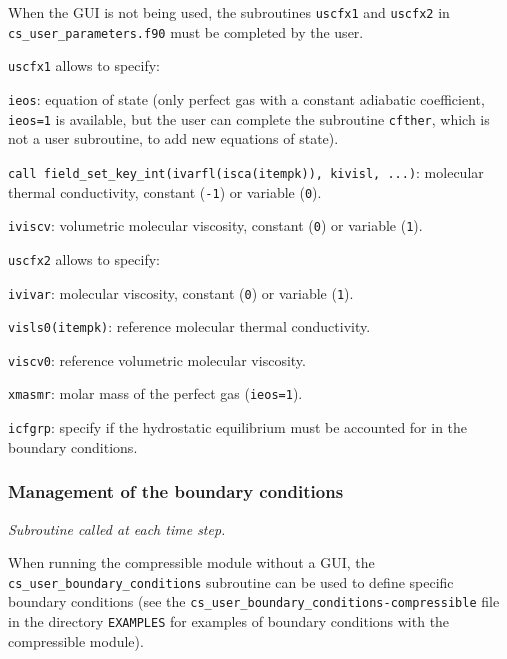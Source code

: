 {{{When the GUI is not being used, the subroutines \texttt{uscfx1} and \texttt{uscfx2} in \texttt{cs\_user\_parameters.f90}
must be completed by the user.

\texttt{uscfx1} allows to specify:
\begin{list}{-}{}
\item \texttt{ieos}: equation of state (only perfect gas with a constant adiabatic coefficient,
                      \texttt{ieos=1} is available, but the user can complete the subroutine
                      \texttt{cfther}, which is not a user subroutine, to add new equations of state).
\item \texttt{call field\_set\_key\_int(ivarfl(isca(itempk)), kivisl, ...)}: molecular thermal conductivity, constant (\texttt{-1}) or variable (\texttt{0}).
\item  \texttt{iviscv}: volumetric molecular viscosity, constant (\texttt{0}) or variable (\texttt{1}).
\end{list}

\texttt{uscfx2} allows to specify:
\begin{list}{-}{}
  \item \texttt{ivivar}: molecular viscosity, constant (\texttt{0}) or variable (\texttt{1}).
  \item \texttt{visls0(itempk)}: reference molecular thermal conductivity.
  \item \texttt{viscv0}: reference volumetric molecular viscosity.
  \item \texttt{xmasmr}: molar mass of the perfect gas (\texttt{ieos=1}).
  \item \texttt{icfgrp}: specify if the hydrostatic equilibrium must be accounted for in the
                         boundary conditions.
\end{list}

\subsubsection{Management of the boundary conditions}

\noindent
\textit{Subroutine called at each time step.}

When running the compressible module without a GUI, the \texttt{cs\_user\_boundary\_conditions} subroutine can be used to define specific boundary conditions
(see the \texttt{cs\_user\_boundary\_conditions-compressible} file in the directory \texttt{EXAMPLES}
for examples of boundary conditions with the compressible module).

}}}
